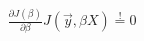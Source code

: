 \[%
\begin{align*}
    \frac{\partial J(\beta)}{\partial \beta} J(\vec{y}, \beta X) \stackrel{!}{=} 0
\end{align*}
\]
